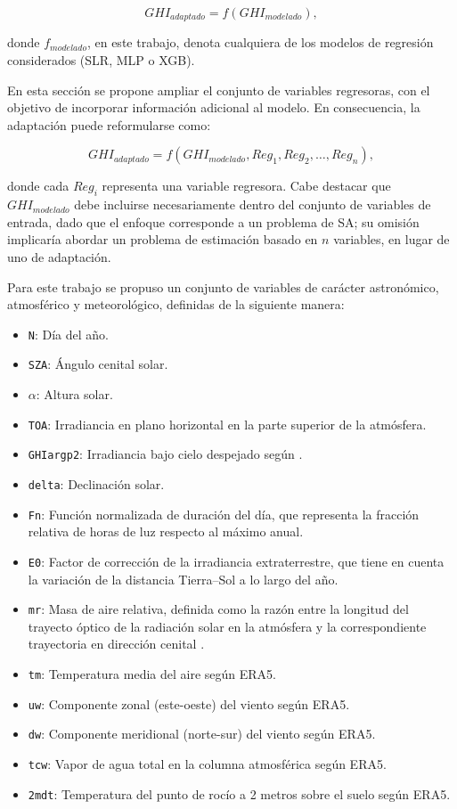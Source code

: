 \begin{equation}
GHI_{adaptado} = f(GHI_{modelado}),
\label{ec:SiteAdapSimple}
\end{equation}

\noindent donde $f_{modelado}$, en este trabajo, denota cualquiera de los modelos de regresión considerados (SLR, MLP o XGB).

En esta sección se propone ampliar el conjunto de variables regresoras, con el objetivo de incorporar información adicional al modelo. En consecuencia, la adaptación puede reformularse como:

\begin{equation}
GHI_{adaptado} = f(GHI_{modelado}, Reg_{1}, Reg_{2}, \dots, Reg_{n}),
\label{ec:SiteAdapMultiple}
\end{equation}

\noindent donde cada $Reg_{i}$ representa una variable regresora. Cabe destacar que $GHI_{modelado}$ debe incluirse necesariamente dentro del conjunto de variables de entrada, dado que el enfoque corresponde a un problema de SA; su omisión implicaría abordar un problema de estimación basado en $n$ variables, en lugar de uno de adaptación.

Para este trabajo se propuso un conjunto de variables de carácter astronómico, atmosférico y meteorológico, definidas de la siguiente manera:

\begin{itemize}
\item \texttt{N}: Día del año.
\item \texttt{SZA}: Ángulo cenital solar.
\item \texttt{$\alpha$}: Altura solar.
\item \texttt{TOA}: Irradiancia en plano horizontal en la parte superior de la atmósfera.
\item \texttt{GHIargp2}: Irradiancia bajo cielo despejado según \cite{Ledesma2023a}.
\item \texttt{delta}: Declinación solar.
\item \texttt{Fn}: Función normalizada de duración del día, que representa la fracción relativa de horas de luz respecto al máximo anual.
\item \texttt{E0}: Factor de corrección de la irradiancia extraterrestre, que tiene en cuenta la variación de la distancia Tierra–Sol a lo largo del año.
\item \texttt{mr}: Masa de aire relativa, definida como la razón entre la longitud del trayecto óptico de la radiación solar en la atmósfera y la correspondiente trayectoria en dirección cenital \cite{Gueymard2003}.
\item \texttt{tm}: Temperatura media del aire según ERA5.
\item \texttt{uw}: Componente zonal (este-oeste) del viento según ERA5.
\item \texttt{dw}: Componente meridional (norte-sur) del viento según ERA5.
\item \texttt{tcw}: Vapor de agua total en la columna atmosférica según ERA5.
\item \texttt{2mdt}: Temperatura del punto de rocío a 2 metros sobre el suelo según ERA5.
\end{itemize}

